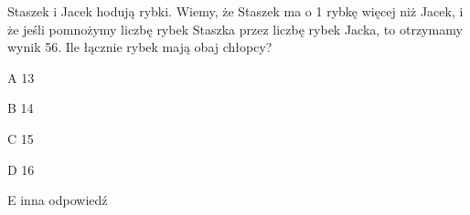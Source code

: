 \begin{tresc}
Staszek i Jacek hodują rybki. Wiemy, że Staszek ma o 1 rybkę więcej niż Jacek, i że jeśli pomnożymy liczbę rybek Staszka przez liczbę rybek Jacka, to otrzymamy wynik 56. Ile łącznie rybek mają obaj chłopcy?
\end{tresc}
\begin{wariant}{A} 13 \end{wariant}
\begin{wariant}{B} 14 \end{wariant}
\begin{wariant}{C} 15 \end{wariant}
\begin{wariant}{D} 16 \end{wariant}
\begin{wariant}{E} inna odpowiedź \end{wariant}
